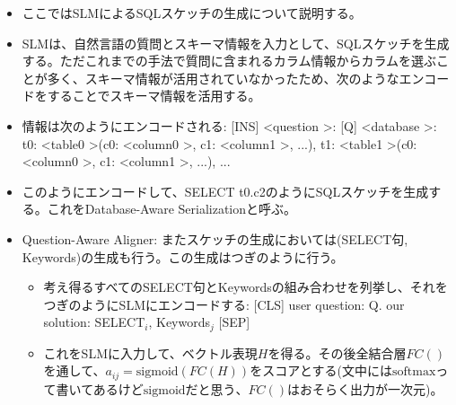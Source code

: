 \documentclass[dvipdfmx,uplatex]{jsarticle}
\theoremstyle{remark}
\newenvironment{method}[1]{
    \begin{tcolorbox}[
        colframe=green!50!black,
        colback=green!50!black!10!white,
        colbacktitle=green!50!black!40!white,
        coltitle=black,
        fonttitle=\bfseries,
        title={#1}
    ]
}{
    \end{tcolorbox}
}
\begin{document}
\begin{method}{SQLスケッチの生成}
\begin{itemize}
    \item ここではSLMによるSQLスケッチの生成について説明する。
    \item SLMは、自然言語の質問とスキーマ情報を入力として、SQLスケッチを生成する。ただこれまでの手法で質問に含まれるカラム情報からカラムを選ぶことが多く、スキーマ情報が活用されていなかったため、次のようなエンコードをすることでスキーマ情報を活用する。
    \item 情報は次のようにエンコードされる: [INS] \textless question \textgreater : [Q] \textless database \textgreater : t0: \textless table0 \textgreater (c0: \textless column0 \textgreater , c1: \textless column1 \textgreater , ...), t1: \textless table1 \textgreater (c0: \textless column0 \textgreater , c1: \textless column1 \textgreater , ...), ... 
    \item このようにエンコードして、SELECT t0.c2のようにSQLスケッチを生成する。これをDatabase-Aware Serializationと呼ぶ。
    \item Question-Aware Aligner: またスケッチの生成においては(SELECT句, Keywords)の生成も行う。この生成はつぎのように行う。
    \begin{itemize}
        \item 考え得るすべてのSELECT句とKeywordsの組み合わせを列挙し、それをつぎのようにSLMにエンコードする: [CLS] user question: Q. our solution: SELECT${}_i$, Keywords${}_j$ [SEP]
        \item これをSLMに入力して、ベクトル表現$H$を得る。その後全結合層$FC()$を通して、$a_{ij} = \mathrm{sigmoid}(FC(H))$をスコアとする(文中には$\mathrm{softmax}$って書いてあるけど$\mathrm{sigmoid}$だと思う、$FC()$はおそらく出力が一次元)。 
    \end{itemize}
\end{itemize}
\end{method}
\end{document}
